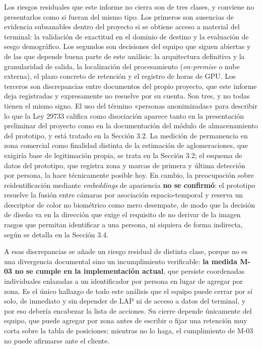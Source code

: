 Los riesgos residuales que este informe no cierra son de tres clases, y
conviene no presentarlos como si fueran del mismo tipo. Los primeros son
ausencias de evidencia subsanables dentro del proyecto si se obtiene
acceso a material del terminal: la validación de exactitud en el dominio
de destino y la evaluación de sesgo demográfico. Los segundos son
decisiones del equipo que siguen abiertas y de las que depende buena
parte de este análisis: la arquitectura definitiva y la granularidad de
salida, la localización del procesamiento (\emph{on-premise} o nube
externa), el plazo concreto de retención y el registro de horas de GPU.
Los terceros son discrepancias entre documentos del propio proyecto, que
este informe deja registradas y expresamente no resuelve por su cuenta.
Son tres, y no todas tienen el mismo signo. El uso del término «personas
anonimizadas» para describir lo que la Ley 29733 califica como
disociación aparece tanto en la presentación preliminar del proyecto
como en la documentación del módulo de almacenamiento del prototipo, y
está tratado en la Sección 3.2. La medición de permanencia en zona
comercial como finalidad distinta de la estimación de aglomeraciones,
que exigiría base de legitimación propia, se trata en la Sección 3.2; el
esquema de datos del prototipo, que registra zona y marcas de primera y
última detección por persona, la hace técnicamente posible hoy. En
cambio, la preocupación sobre reidentificación mediante
\emph{embeddings} de apariencia \textbf{no se confirmó}: el prototipo
resuelve la fusión entre cámaras por asociación espacio-temporal y
reserva un descriptor de color no biométrico como mero desempate, de
modo que la decisión de diseño va en la dirección que exige el requisito
de no derivar de la imagen rasgos que permitan identificar a una
persona, ni siquiera de forma indirecta, según se detalla en la Sección
3.4.

A esas discrepancias se añade un riesgo residual de distinta clase,
porque no es una divergencia documental sino un incumplimiento
verificable: \textbf{la medida M-03 no se cumple en la implementación
actual}, que persiste coordenadas individuales enlazadas a un
identificador por persona en lugar de agregar por zona. Es el único
hallazgo de todo este análisis que el equipo puede cerrar por sí solo,
de inmediato y sin depender de LAP ni de acceso a datos del terminal, y
por eso debería encabezar la lista de acciones. Su cierre depende
únicamente del equipo, que puede agregar por zona antes de escribir o
fijar una retención muy corta sobre la tabla de posiciones; mientras no
lo haga, el cumplimiento de M-03 no puede afirmarse ante el cliente.
